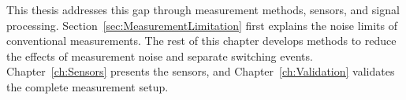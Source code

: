 This thesis addresses this gap through measurement methods, sensors, and signal processing.
Section~\ref{sec:MeasurementLimitation} first explains the noise limits of conventional measurements.
The rest of this chapter develops methods to reduce the effects of measurement noise and separate switching events.
Chapter~\ref{ch:Sensors} presents the sensors, and Chapter~\ref{ch:Validation} validates the complete measurement setup.



